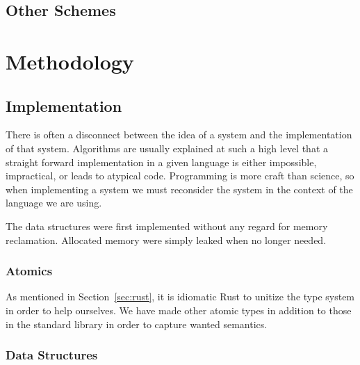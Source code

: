 \documentclass[b5paper]{report}
\begin{document}


\section{Other Schemes}


\chapter{Methodology}


\section{Implementation}
There is often a disconnect between the idea of a system and the implementation
of that system. Algorithms are usually explained at such a high level that a
straight forward implementation in a given language is either impossible,
impractical, or leads to atypical code. Programming is more craft than
science, so when implementing a system we must reconsider the system in the
context of the language we are using.

The data structures were first implemented without any regard for memory
reclamation. Allocated memory were simply leaked when no longer needed.


\subsection{Atomics}


As mentioned in Section~\ref{sec:rust}, it is idiomatic Rust to unitize the type
system in order to help ourselves. We have made other atomic types in addition
to those in the standard library in order to capture wanted semantics.


\subsection{Data Structures}
\label{sec:data-structures}
\end{document}
